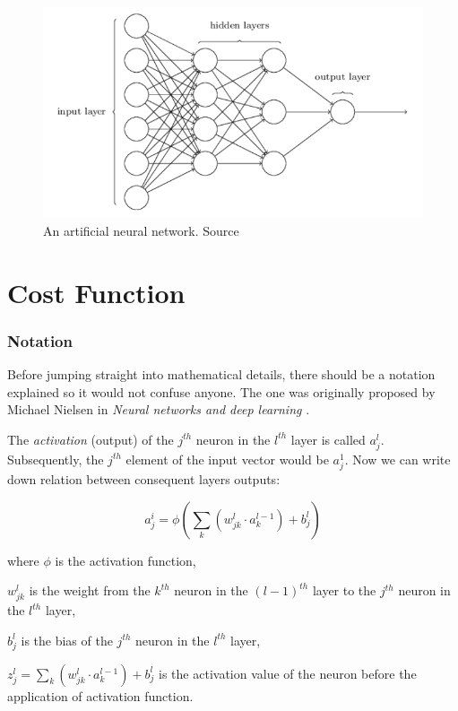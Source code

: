 \begin{figure}[h]
    \centering
    \includegraphics[width=12cm]{img/ANN-diagram.png}
    \caption{An artificial neural network. Source \cite{NNandDL}}
    \label{fig:ann}
\end{figure}

\section{Cost Function}
\label{sec:cost-function}

\subsubsection*{Notation}
\label{sub2:notation}

Before jumping straight into mathematical details, there should be a notation explained so it would not confuse anyone. The one was originally proposed by Michael Nielsen in \emph{Neural networks and deep learning} \cite{NNandDL}.

The \emph{activation} (output) of the $j^{th}$ neuron in the $l^{th}$ layer is called $a^l_j$. Subsequently, the $j^{th}$ element of the input vector would be $a^1_j$. Now we can write down relation between consequent layers outputs:

\begin{equation}
\label{eq:2.1}
a^i_j = \phi\left(\sum_k (w^l_{jk} \cdot a^{l-1}_k) + b^l_j\right)
\end{equation}

where $\phi$ is the activation function,

$w^l_{jk}$ is the weight from the $k^{th}$ neuron in the $(l-1)^{th}$ layer to the $j^{th}$ neuron in the $l^{th}$ layer,

$b^l_j$ is the bias of the $j^{th}$ neuron in the $l^{th}$ layer,

$z^l_j = \sum_k (w^l_{jk} \cdot a^{l-1}_k) + b^l_j$ is the activation value of the neuron before the application of activation function.

